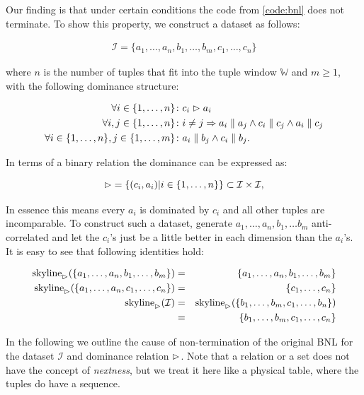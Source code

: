 Our finding is that under certain conditions the code from
\autoref{code:bnl} does not terminate.  To show this property, we
construct a dataset as follows:

\begin{eqnarray}
\mathcal{I} = \{a_1, \ldots, a_n, b_1, \ldots, b_m, c_1, \ldots, c_n\}
\end{eqnarray}

\noindent
where $n$ is the number of tuples that fit into the tuple window
$\mathbb{W}$ and $m \ge 1$, with the following dominance structure:

\begin{align}
\forall i \in \{1, \ldots, n\}\colon & c_i \vartriangleright a_i \label{eqn:bnlntds1} \\
\forall i, j \in \{1, \ldots, n\}\colon & i \neq j \Rightarrow a_i \parallel a_j \land c_i \parallel c_j \land a_i \parallel c_j \label{eqn:bnlntds2} \\
\forall i \in \{1, \ldots, n\}, j \in \{1, \ldots, m\}\colon & a_i \parallel b_j \land c_i \parallel b_j. \label{eqn:bnlntds3} 
\end{align}

\noindent
In terms of a binary relation the dominance can be expressed as:

\begin{equation}
\vartriangleright\; = \{(c_i, a_i) | i \in \{1, \ldots, n\}\} \subset \mathcal{I} \times \mathcal{I},
\end{equation}

\noindent
In essence this means every $a_i$ is dominated by $c_i$ and all other
tuples are incomparable.  To construct such a dataset, generate $a_1,
\ldots, a_n, b_1, \ldots b_m$ anti-correlated and let the $c_i$'s just be
a little better in each dimension than the $a_i$'s.  It is easy to see
that following identities hold:

\begin{eqnarray}
\skyline_\dominates(\{a_1, \ldots, a_n, b_1, \ldots, b_m\}) &=& \{a_1, \ldots, a_n, b_1, \ldots, b_m\} \\
\skyline_\dominates(\{a_1, \ldots, a_n, c_1, \ldots, c_n\}) &=& \{c_1, \ldots, c_n\} \\
\skyline_\dominates(\mathcal{I}) &=& \skyline_\dominates(\{b_1, \ldots, b_m, c_1, \ldots, b_n\}) \\
                      &=& \{b_1, \ldots, b_m, c_1, \ldots, c_n\}
\end{eqnarray}

In the following we outline the cause of non-termination of the
original BNL for the dataset $\mathcal{I}$ and dominance relation
$\vartriangleright$.  Note that a relation or a set does not have the concept
of \emph{nextness}, but we treat it here like a physical table, where
the tuples do have a sequence.

